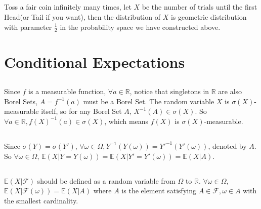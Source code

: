 \documentclass[12pt,letterpaper]{article}
\begin{document}
\subsection{}
Toss a fair coin infinitely many times, let $X$ be the number of trials until the first Head(or Tail if you want), then the distribution of $X$ is geometric distribution with parameter $\frac{1}{2}$ in the probability space we have constructed above.
\section{Conditional Expectations}
\subsection{}
Since $f$ is a measurable function, $\forall a\in\mathbb{R}$, notice that singletons in $\mathbb{R}$ are also Borel Sets, $A=f^{-1}(a)$ must be a Borel Set. The random variable $X$ is $\sigma(X)$-measurable itself, so for any Borel Set $A$, $X^{-1}(A)\in\sigma(X)$. So $\forall a\in\mathbb{R}, f(X)^{-1}(a)\in\sigma(X)$, which means $f(X)$ is $\sigma(X)$-measurable.
\subsection{}
Since $\sigma(Y)=\sigma(Y')$, $\forall \omega\in\Omega, Y^{-1}(Y(\omega))=Y'^{-1}(Y'(\omega))$, denoted by $A$. So $\forall\omega\in\Omega$, $\mathbb{E}(X|Y=Y(\omega))=\mathbb{E}(X|Y'=Y'(\omega))=\mathbb{E}(X|A)$.
\subsection{}
$\mathbb{E}(X|\mathcal{F})$ should be defined as a random variable from $\Omega$ to $\mathbb{R}$. $\forall\omega\in\Omega$, $\mathbb{E}(X|\mathcal{F(\omega)})=\mathbb{E}(X|A)$ where $A$ is the element satisfying $A\in\mathcal{F},\omega\in A$ with the smallest cardinality.   
\end{document}
